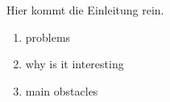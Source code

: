 Hier kommt die Einleitung rein.
\begin{enumerate}
  \item problems
  \item why is it interesting
  \item main obstacles
\end{enumerate}
